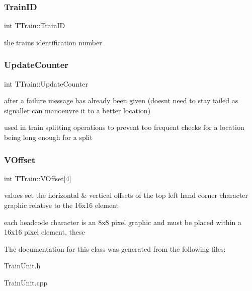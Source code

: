 \subsubsection{\texorpdfstring{Train\+ID}{TrainID}}
{\footnotesize\ttfamily int T\+Train\+::\+Train\+ID\hspace{0.3cm}{\ttfamily [private]}}

the train\textquotesingle{}s identification number \mbox{\label{class_t_train_ae57749c241ad7256c6f628faf1168ce7}} 
\subsubsection{\texorpdfstring{Update\+Counter}{UpdateCounter}}
{\footnotesize\ttfamily int T\+Train\+::\+Update\+Counter\hspace{0.3cm}{\ttfamily [private]}}



after a failure message has already been given (doesn\textquotesingle{}t need to stay failed as signaller can manoeuvre it to a better location) 

used in train splitting operations to prevent too frequent checks for a location being long enough for a split \mbox{\label{class_t_train_a4c8b153a620229a3d9cc54f64ffa5f4a}} 
\subsubsection{\texorpdfstring{V\+Offset}{VOffset}}
{\footnotesize\ttfamily int T\+Train\+::\+V\+Offset\mbox{[}4\mbox{]}\hspace{0.3cm}{\ttfamily [private]}}



values set the horizontal \& vertical offsets of the top left hand corner character graphic relative to the 16x16 element 

each headcode character is an 8x8 pixel graphic and must be placed within a 16x16 pixel element, these 

The documentation for this class was generated from the following files\+:\begin{DoxyCompactItemize}
\item 
Train\+Unit.\+h\item 
Train\+Unit.\+cpp\end{DoxyCompactItemize}
